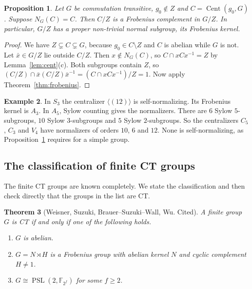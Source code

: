 \documentclass[12pt,letterpaper]{article}
\numberwithin{equation}{section}
\theoremstyle{plain}
\newtheorem{theorem}{Theorem}[section]
\newtheorem{proposition}[theorem]{Proposition}
\theoremstyle{definition}
\newtheorem{example}[theorem]{Example}
\newcommand{\F}{\mathbb{F}}
\DeclareMathOperator{\Cent}{Cent}
\DeclareMathOperator{\PSL}{PSL}
\begin{document}
\begin{proposition}\label{prop:selfnorm}
Let $G$ be commutation transitive, $g_0\notin Z$ and $C=\Cent(g_0,G)$.
Suppose $N_G(C)=C$. Then $C/Z$ is a Frobenius complement in $G/Z$. In
particular, $G/Z$ has a proper non-trivial normal subgroup, its Frobenius
kernel.
\end{proposition}

\begin{proof}
We have $Z\subsetneq C\subsetneq G$, because $g_0\in C\setminus Z$ and $C$
is abelian while $G$ is not. Let $\bar x\in G/Z$ lie outside $C/Z$. Then
$x\notin N_G(C)$, so $C\cap xCx^{-1}=Z$ by Lemma~\ref{lem:cent}(c). Both
subgroups contain $Z$, so $(C/Z)\cap\bar x(C/Z)\bar x^{-1}=
(C\cap xCx^{-1})/Z=1$. Now apply Theorem~\ref{thm:frobenius}.
\end{proof}

\begin{example}\label{ex:selfnorm}
In $S_3$ the centralizer $\langle(12)\rangle$ is self-normalizing. Its
Frobenius kernel is $A_3$. In $A_5$, Sylow counting gives the normalizers.
There are $6$ Sylow $5$-subgroups, $10$ Sylow $3$-subgroups and $5$ Sylow
$2$-subgroups. So the centralizers $C_5$, $C_3$ and $V_4$ have normalizers
of orders $10$, $6$ and $12$. None is self-normalizing, as
Proposition~\ref{prop:selfnorm} requires for a simple group.
\end{example}

\subsection{The classification of finite CT groups}\label{sec:classif}

The finite CT groups are known completely. We state the classification and
then check directly that the groups in the list are CT.

\begin{theorem}[Weisner, Suzuki, Brauer--Suzuki--Wall, Wu. Cited]
\label{thm:classif}
A finite group $G$ is CT if and only if one of the following holds.
\begin{enumerate}[label=(\roman*),itemsep=1pt]
\item $G$ is abelian.
\item $G=N\rtimes H$ is a Frobenius group with abelian kernel $N$ and cyclic
  complement $H\neq1$.
\item $G\cong\PSL(2,\F_{2^f})$ for some $f\ge2$.
\end{enumerate}
\end{theorem}
\end{document}
